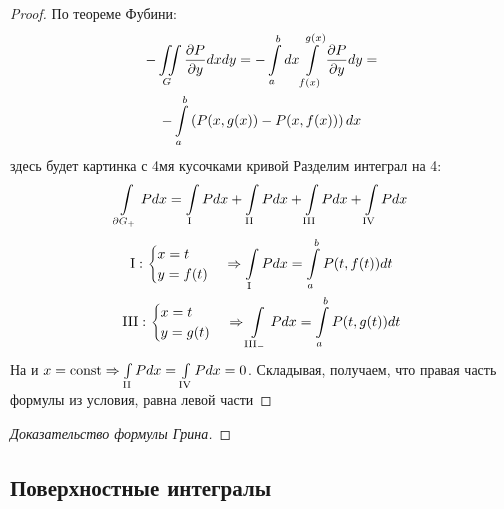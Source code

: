 \begin{proof}
	По теореме Фубини:
	\begin{gather*} 
		-\iint\limits_{G} \frac{\partial P}{\partial y} dxdy = 
		-\int\limits_{a}^{b}dx\int\limits_{f(x)}^{g(x)} \frac{\partial P}{\partial y} dy = \\
		-\int\limits_{a}^{b}\left( P(x, g(x)) - P(x, f(x)) \right) dx
	\end{gather*}
	\todo здесь будет картинка с 4мя кусочками кривой
	Разделим интеграл на 4:
	\begin{gather*}
		\intl{\partial G_{+}} P dx = \intl{\text{\rom{1}}}Pdx + 
		\intl{\text{\rom{2}}}Pdx + \intl{\text{\rom{3}}}Pdx + \intl{\text{\rom{4}}}Pdx
	\end{gather*}
	\begin{gather*}
		\text{\rom{1}}: \begin{cases}
							x = t \\ 
							y = f(t)
						\end{cases} 
		\Rightarrow
		\intl{\text{\rom{1}}} P dx = \intlr{a}{b} P(t, f(t)) dt \\
		\text{\rom{3}}: \begin{cases}
							x = t \\ 
							y = g(t)
						\end{cases} 
		\Rightarrow
		\intl{\text{\rom{3}}_{-}} P dx = \intlr{a}{b} P(t, g(t)) dt 
	\end{gather*}
	На  и  $x = \text{const} \Rightarrow \intl{\text{\rom{2}}} Pdx = 
	\intl{\text{\rom{4}}}Pdx = 0$.
	Складывая, получаем, что правая часть формулы из условия, равна левой части
\end{proof}

\begin{proof}[Доказательство формулы Грина]
\end{proof}
\newpage

\subsection{Поверхностные интегралы}


